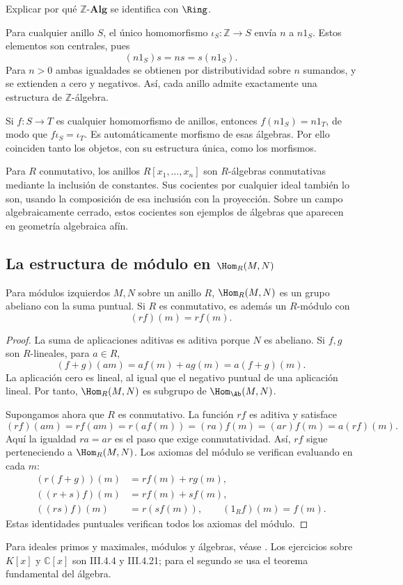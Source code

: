 \begin{ejer}\label{ejer:C13-Zalg}
Explicar por qué $\mathbb Z\text{-}\mathbf{Alg}$ se identifica con $\Ring$.
\end{ejer}
\begin{sol}
Para cualquier anillo $S$, el único homomorfismo $\iota_S:\mathbb Z\to S$ envía $n$ a $n1_S$. Estos elementos son centrales, pues
\[
(n1_S)s=ns=s(n1_S).
\]
Para $n>0$ ambas igualdades se obtienen por distributividad sobre $n$ sumandos, y se extienden a cero y negativos. Así, cada anillo admite exactamente una estructura de $\mathbb Z$-álgebra.

Si $f:S\to T$ es cualquier homomorfismo de anillos, entonces $f(n1_S)=n1_T$, de modo que $f\iota_S=\iota_T$. Es automáticamente morfismo de esas álgebras. Por ello coinciden tanto los objetos, con su estructura única, como los morfismos.
\end{sol}

Para $R$ conmutativo, los anillos $R[x_1,\ldots,x_n]$ son $R$-álgebras conmutativas mediante la inclusión de constantes. Sus cocientes por cualquier ideal también lo son, usando la composición de esa inclusión con la proyección. Sobre un campo algebraicamente cerrado, estos cocientes son ejemplos de álgebras que aparecen en geometría algebraica afín.

\subsection{La estructura de módulo en \texorpdfstring{$\Hom_R(M,N)$}{Hom}}
\begin{prop}\label{prop:C13-Hom}
Para módulos izquierdos $M,N$ sobre un anillo $R$, $\Hom_R(M,N)$ es un grupo abeliano con la suma puntual. Si $R$ es conmutativo, es además un $R$-módulo con
\[
(rf)(m)=rf(m).
\]
\end{prop}
\begin{proof}
La suma de aplicaciones aditivas es aditiva porque $N$ es abeliano. Si $f,g$ son $R$-lineales, para $a\in R$,
\[
(f+g)(am)=af(m)+ag(m)=a(f+g)(m).
\]
La aplicación cero es lineal, al igual que el negativo puntual de una aplicación lineal. Por tanto, $\Hom_R(M,N)$ es subgrupo de $\Hom_{\Ab}(M,N)$.

Supongamos ahora que $R$ es conmutativo. La función $rf$ es aditiva y satisface
\[
(rf)(am)=rf(am)=r(af(m))=(ra)f(m)
=(ar)f(m)=a(rf)(m).
\]
Aquí la igualdad $ra=ar$ es el paso que exige conmutatividad. Así, $rf$ sigue perteneciendo a $\Hom_R(M,N)$. Los axiomas del módulo se verifican evaluando en cada $m$:
\[
\begin{aligned}
(r(f+g))(m)&=rf(m)+rg(m),\\
((r+s)f)(m)&=rf(m)+sf(m),\\
((rs)f)(m)&=r(sf(m)),\qquad (1_Rf)(m)=f(m).
\end{aligned}
\]
Estas identidades puntuales verifican todos los axiomas del módulo.
\end{proof}

\begin{obs}
Para ideales primos y maximales, módulos y álgebras, véase \citet[cap.~III, 4.6--7/9--14 y 5.1--7]{aluffi2009}. Los ejercicios sobre $K[x]$ y $\mathbb C[x]$ son III.4.4 y III.4.21; para el segundo se usa el teorema fundamental del álgebra.
\end{obs}
